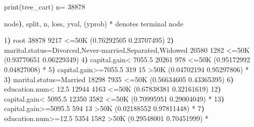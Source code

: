 \documentclass[
  11pt,
]{book}
\makeatletter
\newenvironment{Shaded}{}{}
\newcommand{\DecValTok}[1]{#1}
\newcommand{\ErrorTok}[1]{\textcolor[rgb]{0.21,0.21,0.21}{\textbf{#1}}}
\newcommand{\FloatTok}[1]{#1}
\newcommand{\FunctionTok}[1]{#1}
\newcommand{\NormalTok}[1]{#1}
\newcommand{\OtherTok}[1]{\textcolor[rgb]{0.39,0.39,0.39}{#1}}
\newcommand{\SpecialCharTok}[1]{\textcolor[rgb]{0.39,0.39,0.39}{#1}}
\newenvironment{kframe}{%
\medskip{}
\setlength{\fboxsep}{.8em}
 \def\at@end@of@kframe{}%
 \ifinner\ifhmode%
  \def\at@end@of@kframe{\end{minipage}}%
  \begin{minipage}{\columnwidth}%
 \fi\fi%
 \def\FrameCommand##1{\hskip\@totalleftmargin \hskip-\fboxsep
 \colorbox{shadecolor}{##1}\hskip-\fboxsep
     \hskip-\linewidth \hskip-\@totalleftmargin \hskip\columnwidth}%
 \MakeFramed {\advance\hsize-\width
   \@totalleftmargin\z@ \linewidth\hsize
   \@setminipage}}%
 {\par\unskip\endMakeFramed%
 \at@end@of@kframe}
\renewenvironment{Shaded}{\begin{kframe}}{\end{kframe}}
\theoremstyle{definition}
\theoremstyle{definition}
\theoremstyle{definition}
\theoremstyle{definition}
\theoremstyle{remark}
\makeatother
\begin{document}
\begin{Shaded}
\begin{Highlighting}[]
\FunctionTok{print}\NormalTok{(tree\_cart)}
\NormalTok{   n}\OtherTok{=} \DecValTok{38878} 
   
\NormalTok{   node}\ErrorTok{)}\NormalTok{, split, n, loss, yval, (yprob)}
         \SpecialCharTok{*}\NormalTok{ denotes terminal node}
   
    \DecValTok{1}\ErrorTok{)}\NormalTok{ root }\DecValTok{38878} \DecValTok{9217} \SpecialCharTok{\textless{}=}\DecValTok{50}\FunctionTok{K}\NormalTok{ (}\FloatTok{0.76292505} \FloatTok{0.23707495}\NormalTok{)  }
      \DecValTok{2}\ErrorTok{)}\NormalTok{ marital.status}\OtherTok{=}\NormalTok{Divorced,Never}\SpecialCharTok{{-}}\NormalTok{married,Separated,Widowed }\DecValTok{20580} \DecValTok{1282} \SpecialCharTok{\textless{}=}\DecValTok{50}\FunctionTok{K}\NormalTok{ (}\FloatTok{0.93770651} \FloatTok{0.06229349}\NormalTok{)  }
        \DecValTok{4}\ErrorTok{)}\NormalTok{ capital.gain}\SpecialCharTok{\textless{}} \FloatTok{7055.5} \DecValTok{20261}  \DecValTok{978} \SpecialCharTok{\textless{}=}\DecValTok{50}\FunctionTok{K}\NormalTok{ (}\FloatTok{0.95172992} \FloatTok{0.04827008}\NormalTok{) }\SpecialCharTok{*}
        \DecValTok{5}\ErrorTok{)}\NormalTok{ capital.gain}\SpecialCharTok{\textgreater{}=}\FloatTok{7055.5} \DecValTok{319}   \DecValTok{15} \SpecialCharTok{\textgreater{}}\DecValTok{50}\FunctionTok{K}\NormalTok{ (}\FloatTok{0.04702194} \FloatTok{0.95297806}\NormalTok{) }\SpecialCharTok{*}
      \DecValTok{3}\ErrorTok{)}\NormalTok{ marital.status}\OtherTok{=}\NormalTok{Married }\DecValTok{18298} \DecValTok{7935} \SpecialCharTok{\textless{}=}\DecValTok{50}\FunctionTok{K}\NormalTok{ (}\FloatTok{0.56634605} \FloatTok{0.43365395}\NormalTok{)  }
        \DecValTok{6}\ErrorTok{)}\NormalTok{ education.num}\SpecialCharTok{\textless{}} \FloatTok{12.5} \DecValTok{12944} \DecValTok{4163} \SpecialCharTok{\textless{}=}\DecValTok{50}\FunctionTok{K}\NormalTok{ (}\FloatTok{0.67838381} \FloatTok{0.32161619}\NormalTok{)  }
         \DecValTok{12}\ErrorTok{)}\NormalTok{ capital.gain}\SpecialCharTok{\textless{}} \FloatTok{5095.5} \DecValTok{12350} \DecValTok{3582} \SpecialCharTok{\textless{}=}\DecValTok{50}\FunctionTok{K}\NormalTok{ (}\FloatTok{0.70995951} \FloatTok{0.29004049}\NormalTok{) }\SpecialCharTok{*}
         \DecValTok{13}\ErrorTok{)}\NormalTok{ capital.gain}\SpecialCharTok{\textgreater{}=}\FloatTok{5095.5} \DecValTok{594}   \DecValTok{13} \SpecialCharTok{\textgreater{}}\DecValTok{50}\FunctionTok{K}\NormalTok{ (}\FloatTok{0.02188552} \FloatTok{0.97811448}\NormalTok{) }\SpecialCharTok{*}
        \DecValTok{7}\ErrorTok{)}\NormalTok{ education.num}\SpecialCharTok{\textgreater{}=}\FloatTok{12.5} \DecValTok{5354} \DecValTok{1582} \SpecialCharTok{\textgreater{}}\DecValTok{50}\FunctionTok{K}\NormalTok{ (}\FloatTok{0.29548001} \FloatTok{0.70451999}\NormalTok{) }\SpecialCharTok{*}
\end{Highlighting}
\end{Shaded}
\end{document}
